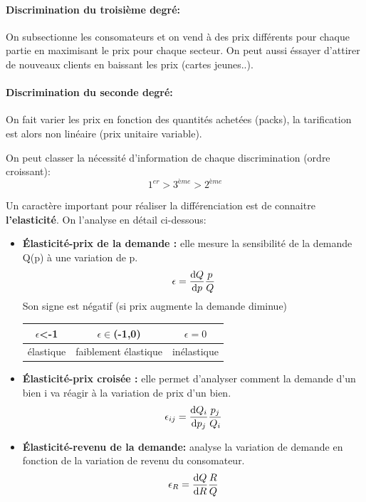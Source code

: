 \paragraph{Discrimination du troisième degré:} %
 \label{par:discrimination_du_troisieme_degre}
 On subsectionne les consomateurs et on vend à des prix différents pour chaque partie 
 en maximisant le prix pour chaque secteur. On peut aussi éssayer d'attirer de nouveaux 
 clients en baissant les prix (cartes jeunes..).
 
 \paragraph{Discrimination du seconde degré:} %
 \label{par:discrimination_du_seconde_degre}
 On fait varier les prix en fonction des quantités achetées (packs), 
 la tarification est alors non linéaire (prix unitaire variable).
 


On peut classer la nécessité d'information de chaque discrimination (ordre croissant):
\[
	1^{er} > 3^{ème} > 2^{ème}
\]

Un caractère important pour réaliser la différenciation est de connaitre \textbf{l'elasticité}. On l'analyse en détail ci-dessous:

\begin{tcolorbox}[title=Élasticités]
	\begin{itemize}[label=]
		\item \textbf{Élasticité-prix de la demande :} elle mesure la sensibilité de la demande Q(p) à une variation de p. 
		\[
			\epsilon = \frac{\operatorname{d}\! Q}{\operatorname{d}\! p}\frac{p}{Q}
		\]
		Son signe est négatif (si prix augmente la demande diminue)
		\begin{tabular}{|c|c|c|}
		\hline
		$\epsilon$<-1 & $\epsilon \in$(-1,0) & $\epsilon =0$ \\
		\hline 
		élastique & faiblement élastique & inélastique \\
		\hline
		\end{tabular}
	
	
	
		\item \textbf{Élasticité-prix croisée :} elle permet d'analyser comment la demande d'un bien i va réagir à la variation de prix d'un bien.
		\[
			\epsilon_{ij} = \frac{\operatorname{d}\! Q_i}{\operatorname{d}\! p_j}\frac{p_j}{Q_i}
		\]
		\item \textbf{Élasticité-revenu de la demande:} analyse la variation de demande en fonction de la variation de revenu du consomateur.
		\[
			\epsilon_R = \frac{\operatorname{d}\! Q}{\operatorname{d}\! R}\frac{R}{Q}
		\]
	\end{itemize}
\end{tcolorbox}

